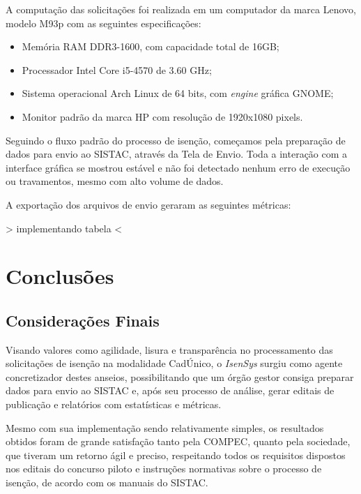 \documentclass[
	12pt,			%
	openright,		%
	oneside,	
	a4paper,		%
	english,		%
	brazil			%
]{abntex2/abntex2}  %
\begin{document}
		A computação das solicitações foi realizada em um computador da marca Lenovo, modelo M93p com as seguintes especificações:
		
		\begin{itemize}
			
			\item Memória RAM DDR3-1600, com capacidade total de 16GB;
			\item Processador Intel{\textregistered} Core{\texttrademark} i5-4570 de 3.60 GHz;
			\item Sistema operacional Arch Linux de 64 bits, com \textit{engine} gráfica GNOME;
			\item Monitor padrão da marca HP com resolução de 1920x1080 pixels.
			
		\end{itemize}
		
		Seguindo o fluxo padrão do processo de isenção, começamos pela preparação de dados para envio ao SISTAC, através da Tela de Envio. Toda a interação com a interface gráfica se mostrou estável e não foi detectado nenhum erro de execução ou travamentos, mesmo com alto volume de dados.
		
		A exportação dos arquivos de envio geraram as seguintes métricas:
	
		{\textgreater} implementando tabela {\textless}

	\chapter{Conclusões}
	
		\section{Considerações Finais}
	
			Visando valores como agilidade, lisura e transparência no processamento das solicitações de isenção na modalidade CadÚnico, o \textit{IsenSys} surgiu como agente concretizador destes anseios, possibilitando que um órgão gestor consiga preparar dados para envio ao SISTAC e, após seu processo de análise, gerar editais de publicação e relatórios com estatísticas e métricas.
			
			Mesmo com sua implementação sendo relativamente simples, os resultados obtidos foram de grande satisfação tanto pela COMPEC, quanto pela sociedade, que tiveram um retorno ágil e preciso, respeitando todos os requisitos dispostos nos editais do concurso piloto e instruções normativas sobre o processo de isenção, de acordo com os manuais do SISTAC.
			
\end{document}
